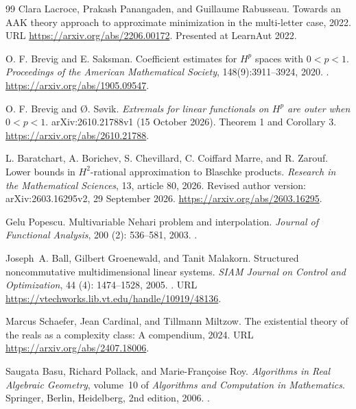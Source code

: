 \begin{thebibliography}{99}
Clara Lacroce, Prakash Panangaden, and Guillaume Rabusseau.
\newblock Towards an {AAK} theory approach to approximate minimization in the
  multi-letter case, 2022.
\newblock URL \url{https://arxiv.org/abs/2206.00172}.
\newblock Presented at LearnAut 2022.

O. F. Brevig and E. Saksman.
Coefficient estimates for $H^p$ spaces with $0<p<1$.
\emph{Proceedings of the American Mathematical Society}, 148(9):3911--3924, 2020.
.
\url{https://arxiv.org/abs/1905.09547}.

O. F. Brevig and \O. S\o vik. \emph{Extremals for linear functionals on $H^p$ are outer when $0<p<1$}. arXiv:2610.21788v1 (15 October 2026). Theorem 1 and Corollary 3. \url{https://arxiv.org/abs/2610.21788}.

L. Baratchart, A. Borichev, S. Chevillard, C. Coiffard Marre, and R. Zarouf.
Lower bounds in $H^2$-rational approximation to Blaschke products.
\emph{Research in the Mathematical Sciences}, 13, article 80, 2026.
Revised author version: arXiv:2603.16295v2, 29 September 2026.
\url{https://arxiv.org/abs/2603.16295}.

Gelu Popescu.
\newblock Multivariable {Nehari} problem and interpolation.
\newblock \emph{Journal of Functional Analysis}, 200 (2):
  536--581, 2003.
\newblock {}.

Joseph~A. Ball, Gilbert Groenewald, and Tanit Malakorn.
\newblock Structured noncommutative multidimensional linear systems.
\newblock \emph{SIAM Journal on Control and Optimization}, 44
  (4): 1474--1528, 2005.
\newblock {}.
\newblock URL \url{https://vtechworks.lib.vt.edu/handle/10919/48136}.

Marcus Schaefer, Jean Cardinal, and Tillmann Miltzow.
\newblock The existential theory of the reals as a complexity class: A
  compendium, 2024.
\newblock URL \url{https://arxiv.org/abs/2407.18006}.

Saugata Basu, Richard Pollack, and Marie-Fran\c{c}oise Roy.
\newblock \emph{Algorithms in Real Algebraic Geometry}, volume~10 of
  \emph{Algorithms and Computation in Mathematics}.
\newblock Springer, Berlin, Heidelberg, 2nd edition, 2006.
\newblock {}.


\end{thebibliography}
